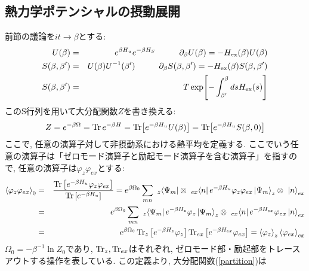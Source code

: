 \documentclass[10.5pt,a4paper]{jreport}
\begin{document}
\subsection{熱力学ポテンシャルの摂動展開}
前節の議論を$it \rightarrow \beta$とする:
\begin{eqnarray}
  U(\beta) &=& e^{\beta H_u}e^{-\beta H_S}\hspace{1cm}\partial_\beta U(\beta) = -H_{\rm ex}(\beta)U(\beta)\\
  S(\beta, \beta') &=& U(\beta)U^{-1}(\beta')\hspace{1cm}\partial_\beta S(\beta, \beta') = -H_{\rm ex}(\beta)S(\beta, \beta')\\
  S(\beta, \beta') &=& T\exp[-\int_{\beta'}^{\beta}ds H_{\rm ex}(s)]
\end{eqnarray}
このS行列を用いて大分配関数$Z$を書き換える:
\begin{eqnarray}
  Z = e^{-\beta\Omega} = \Tr e^{-\beta H} = \Tr[e^{-\beta H_u}U(\beta)]= \Tr[e^{-\beta H_u}S(\beta, 0)]\label{partition}
\end{eqnarray}
ここで, 任意の演算子対して非摂動系における熱平均を定義する. ここでいう任意の演算子は「ゼロモード演算子と励起モード演算子を含む演算子」を指すので, 任意の演算子は$\varphi_{z}\varphi_{ex}$とする:
\begin{eqnarray}
\nonumber  \ev{\varphi_{z}\varphi_{ex}}_0 &=& \frac{\Tr\qty[e^{-\beta H_u}\varphi_{z}\varphi_{ex}]}{\Tr\qty[e^{-\beta H_u}]} = e^{\beta\Omega_0}\sum_{mn}\ _z\!\bra{\Psi_m}\otimes\ _{ex}\!\bra{n}e^{-\beta H_u}\varphi_z\varphi_{ex} \ket{\Psi_m}_z\otimes\ \ket{n}_{ex}\\
\nonumber  &=& e^{\beta\Omega_0}\sum_{mn}\ _z\!\bra{\Psi_m}e^{-\beta H_z}\varphi_z\ket{\Psi_m}_z\otimes\ _{ex}\!\bra{n}e^{-\beta H_{ex}}\varphi_{ex}\ket{n}_{ex}\\
  &=& e^{\beta\Omega_0}\Tr_{z}\qty[e^{-\beta H_z}\varphi_z]\Tr_{ex}\qty[e^{-\beta H_{ex}}\varphi_{ex}] = \ev{\varphi_z}_z\ev{\varphi_{ex}}_{ex}
\end{eqnarray}
$\Omega_0 = -\beta^{-1}\ln Z_0$であり, $\Tr_z, \Tr_{ex}$はそれぞれ, ゼロモード部・励起部をトレースアウトする操作を表している. この定義より, 大分配関数(\ref{partition})は
\end{document}
